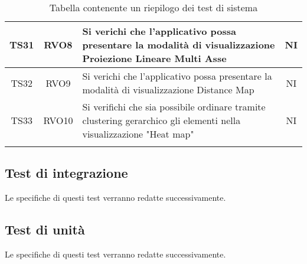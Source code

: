 \documentclass[../piano_di_qualifica.tex]{subfiles}
\begin{document}
\begin{center}
\begin{longtable}{|c|c|p{8.5cm}|c|}
		TS31  & RVO8 & Si verichi che l’applicativo possa presentare la modalità di visualizzazione Proiezione Lineare Multi Asse & NI \\ \hline
		TS32  & RVO9 & Si verichi che l’applicativo possa presentare la modalità di visualizzazione Distance Map & NI \\ \hline
		TS33  & RVO10 &  Si verifichi che sia possibile ordinare tramite clustering gerarchico gli elementi nella visualizzazione "Heat map" & NI \\ \hline
		\hline
		\rowcolor{white}
		\caption{Tabella contenente un riepilogo dei test di sistema}
	\end{longtable}

\end{center}


\subsection{Test di integrazione}%
\label{sub:test_int}
Le specifiche di questi test verranno redatte successivamente.

\subsection{Test di unità}%
\label{sub:test_unit}
Le specifiche di questi test verranno redatte successivamente.
\end{document}
